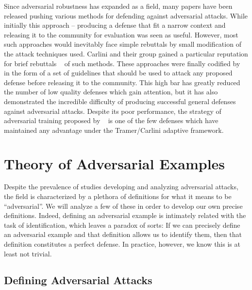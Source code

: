 Since adversarial robustness has expanded as a field, many papers have
been released pushing various methods for defending against
adversarial attacks. While initially this approach -- producing a
defense that fit a narrow context and releasing it to the community
for evaluation was seen as useful. However, most such approaches would
inevitably face simple rebuttals by small modification of the attack
techniques used. Carlini and their group gained a particular
reputation for brief rebuttals ~\citep{carlini_towards_2016,
  papernot_cleverhans_2016} of such methods. These approaches were
finally codified by ~\citet{tramer2020adaptive} in the form of a set of
guidelines that should be used to attack any proposed defense before
releasing it to the community. This high bar has greatly reduced the
number of low quality defenses which gain attention, but it has also
demonstrated the incredible difficulty of producing successful general
defenses against adversarial attacks. Despite its poor
performance, the strategy of adversarial training proposed by
~\citet{tramer2019adversarial} is one of the few
defenses which have maintained any advantage under the Tramer/Carlini
adaptive framework. 


\section{Theory of Adversarial Examples}

Despite the prevalence of studies developing and analyzing adversarial
attacks, the field is characterized by a plethora of definitions for
what it means to be ``adversarial''. We will analyze a few of these in
order to develop our own precise definitions. Indeed, defining an
adversarial example is intimately related with the task of
identification, which leaves a paradox of sorts: If we can precisely
define an adversarial example and that definition allows us to
identify them, then that definition constitutes a perfect defense. In
practice, however, we know this is at least not trivial. 

\subsection{Defining Adversarial Attacks}

